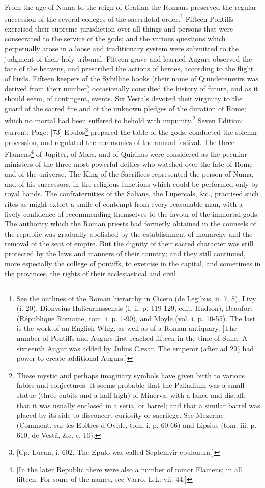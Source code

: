 From the age of Numa to the reign of Gratian the Romans preserved the regular succession of the several colleges of the sacerdotal order.\footnote{See the outlines of the Roman hierarchy in Cicero (de Legibus, ii. 7, 8), Livy (i. 20), Dionysius Halicarnassensis (l. ii. p. 119-129, edit. Hudson), Beaufort (République Romaine, tom. i. p. 1-90), and Moyle (vol. i. p. 10-55). The last is the work of an English Whig, as well as of a Roman antiquary. [The number of Pontiffs and Augurs first reached fifteen in the time of Sulla. A sixteenth Augur was added by Julius Cæsar. The emperor (after ad 29) had power to create additional Augurs.]} Fifteen Pontiffs exercised their supreme jurisdiction over all things and persons that were consecrated to the service of the gods; and the various questions which perpetually arose in a loose and traditionary system were submitted to the judgment of their holy tribunal. Fifteen grave and learned Augurs observed the face of the heavens, and prescribed the actions of heroes, according to the flight of birds. Fifteen keepers of the Sybilline books (their name of Quindecemvirs was derived from their number) occasionally consulted the history of future, and as it should seem, of contingent, events. Six Vestals devoted their virginity to the guard of the sacred fire and of the unknown pledges of the duration of Rome; which no mortal had been suffered to behold with impunity.\footnote{These mystic and perhaps imaginary symbols have given birth to various fables and conjectures. It seems probable that the Palladium was a small statue (three cubits and a half high) of Minerva, with a lance and distaff; that it was usually enclosed in a seria, or barrel; and that a similar barrel was placed by its side to disconcert curiosity or sacrilege. See Mezeriac (Comment. sur les Epitres d\texthebrew{}’Ovide, tom. i. p. 60-66) and Lipsius (tom. iii. p. 610, de Vestâ, \&c. c. 10).} Seven Edition: current; Page: [73] Epulos\footnote{[Cp. Lucan, i. 602. The Epulo was called Septemvir epulonum.]} prepared the table of the gods, conducted the solemn procession, and regulated the ceremonies of the annual festival. The three Flamens\footnote{[In the later Republic there were also a number of minor Flamens; in all fifteen. For some of the names, see Varro, L.L. vii. 44.]} of Jupiter, of Mars, and of Quirinus were considered as the peculiar ministers of the three most powerful deities who watched over the fate of Rome and of the universe. The King of the Sacrifices represented the person of Numa, and of his successors, in the religious functions which could be performed only by royal hands. The confraternities of the Salians, the Lupercals, \&c., practised such rites as might extort a smile of contempt from every reasonable man, with a lively confidence of recommending themselves to the favour of the immortal gods. The authority which the Roman priests had formerly obtained in the counsels of the republic was gradually abolished by the establishment of monarchy and the removal of the seat of empire. But the dignity of their sacred character was still protected by the laws and manners of their country; and they still continued, more especially the college of pontiffs, to exercise in the capital, and sometimes in the provinces, the rights of their ecclesiastical and civil 